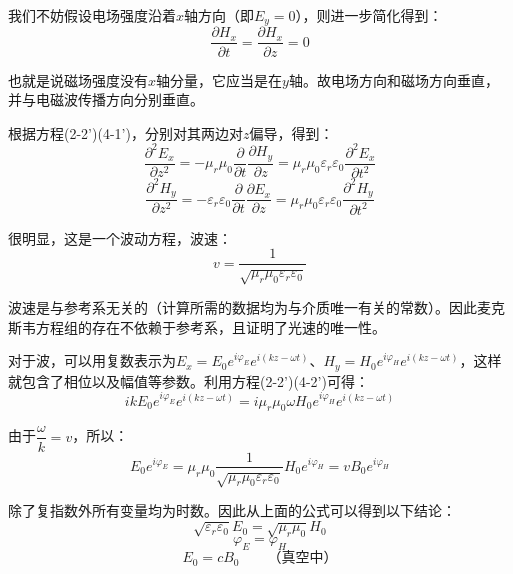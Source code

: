 \begin{prove}[电磁波的性质]
    我们不妨假设电场强度沿着$x$轴方向（即$E_y = 0$），则进一步简化得到：
    \[\dfrac{\partial H_x}{\partial t} = \dfrac{\partial H_x}{\partial z} = 0\]

    也就是说磁场强度没有$x$轴分量，它应当是在$y$轴。故电场方向和磁场方向垂直，并与电磁波传播方向分别垂直。

    根据方程(2-2')(4-1')，分别对其两边对$z$偏导，得到：
    \[\dfrac{\partial^2 E_x}{\partial z^2} = -\mu_r\mu_0\dfrac{\partial}{\partial t}\dfrac{\partial H_y}{\partial z} = \mu_r\mu_0\varepsilon_r\varepsilon_0\dfrac{\partial^2 E_x}{\partial t^2}\]
    \[\dfrac{\partial^2 H_y}{\partial z^2} = -\varepsilon_r\varepsilon_0\dfrac{\partial}{\partial t}\dfrac{\partial E_x}{\partial z} = \mu_r\mu_0\varepsilon_r\varepsilon_0\dfrac{\partial^2 H_y}{\partial t^2}\]

    很明显，这是一个波动方程，波速：
    \[v = \dfrac{1}{\sqrt{\mu_r\mu_0\varepsilon_r\varepsilon_0}}\]

    波速是与参考系无关的（计算所需的数据均为与介质唯一有关的常数）。因此麦克斯韦方程组的存在不依赖于参考系，且证明了光速的唯一性。

    对于波，可以用复数表示为$E_x = E_0 e^{i\varphi_E}e^{i(kz - \omega t)}$、$H_y = H_0 e^{i\varphi_H}e^{i(kz - \omega t)}$，这样就包含了相位以及幅值等参数。利用方程(2-2')(4-2')可得：
    \[ik E_0e^{i\varphi_E}e^{i(kz - \omega t)} = i\mu_r\mu_0\omega H_0e^{i\varphi_H}e^{i(kz - \omega t)}\]

    由于$\dfrac{\omega}{k} = v$，所以：
    \[E_0e^{i\varphi_E} = \mu_r\mu_0\dfrac{1}{\sqrt{\mu_r\mu_0\varepsilon_r\varepsilon_0}}H_0e^{i\varphi_H} = v B_0 e^{i\varphi_H}\]

    除了复指数外所有变量均为时数。因此从上面的公式可以得到以下结论：
    \[\sqrt{\varepsilon_r\varepsilon_0}E_0 = \sqrt{\mu_r\mu_0}H_0\]
    \[\varphi_E = \varphi_H\]
    \[E_0 = cB_0\qquad\text{（真空中）}\]
\end{prove}